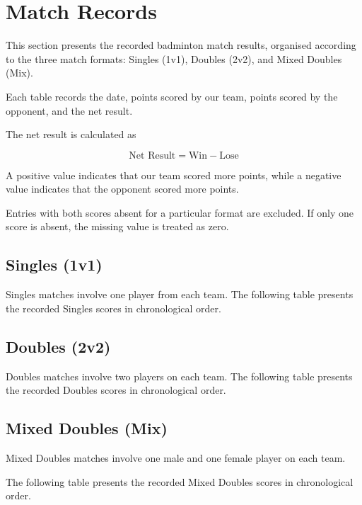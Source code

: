 
\section{Match Records}

This section presents the recorded badminton match
results, organised according to the three match formats:
Singles (1v1), Doubles (2v2), and Mixed Doubles (Mix).

Each table records the date, points scored by our team,
points scored by the opponent, and the net result.

The net result is calculated as

\[
\text{Net Result} = \text{Win} - \text{Lose}
\]

A positive value indicates that our team scored more
points, while a negative value indicates that the
opponent scored more points.

Entries with both scores absent for a particular
format are excluded. If only one score is absent,
the missing value is treated as zero.


\subsection{Singles (1v1)}

Singles matches involve one player from each team.
The following table presents the recorded Singles
scores in chronological order.




\subsection{Doubles (2v2)}

Doubles matches involve two players on each team.
The following table presents the recorded Doubles
scores in chronological order.




\subsection{Mixed Doubles (Mix)}

Mixed Doubles matches involve one male and one female
player on each team.

The following table presents the recorded Mixed
Doubles scores in chronological order.



